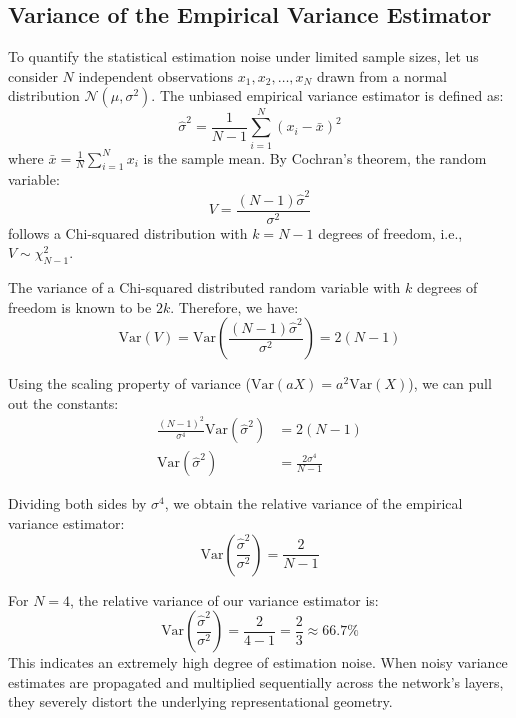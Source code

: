 \documentclass{article}
\begin{document}
\subsection{Variance of the Empirical Variance Estimator}
To quantify the statistical estimation noise under limited sample sizes, let us consider $N$ independent observations $x_1, x_2, \dots, x_N$ drawn from a normal distribution $\mathcal{N}(\mu, \sigma^2)$. The unbiased empirical variance estimator is defined as:
\begin{equation}
\hat{\sigma}^2 = \frac{1}{N-1} \sum_{i=1}^N (x_i - \bar{x})^2
\end{equation}
where $\bar{x} = \frac{1}{N} \sum_{i=1}^N x_i$ is the sample mean. By Cochran's theorem, the random variable:
\begin{equation}
V = \frac{(N-1)\hat{\sigma}^2}{\sigma^2}
\end{equation}
follows a Chi-squared distribution with $k = N-1$ degrees of freedom, i.e., $V \sim \chi^2_{N-1}$. 

The variance of a Chi-squared distributed random variable with $k$ degrees of freedom is known to be $2k$. Therefore, we have:
\begin{equation}
\text{Var}(V) = \text{Var}\left(\frac{(N-1)\hat{\sigma}^2}{\sigma^2}\right) = 2(N-1)
\end{equation}

Using the scaling property of variance ($\text{Var}(aX) = a^2 \text{Var}(X)$), we can pull out the constants:
\begin{align}
\frac{(N-1)^2}{\sigma^4} \text{Var}(\hat{\sigma}^2) &= 2(N-1) \\
\text{Var}(\hat{\sigma}^2) &= \frac{2\sigma^4}{N-1}
\end{align}

Dividing both sides by $\sigma^4$, we obtain the relative variance of the empirical variance estimator:
\begin{equation}
\text{Var}\left(\frac{\hat{\sigma}^2}{\sigma^2}\right) = \frac{2}{N-1}
\end{equation}

For $N=4$, the relative variance of our variance estimator is:
\begin{equation}
\text{Var}\left(\frac{\hat{\sigma}^2}{\sigma^2}\right) = \frac{2}{4-1} = \frac{2}{3} \approx 66.7\%
\end{equation}
This indicates an extremely high degree of estimation noise. When noisy variance estimates are propagated and multiplied sequentially across the network's layers, they severely distort the underlying representational geometry.
\end{document}
